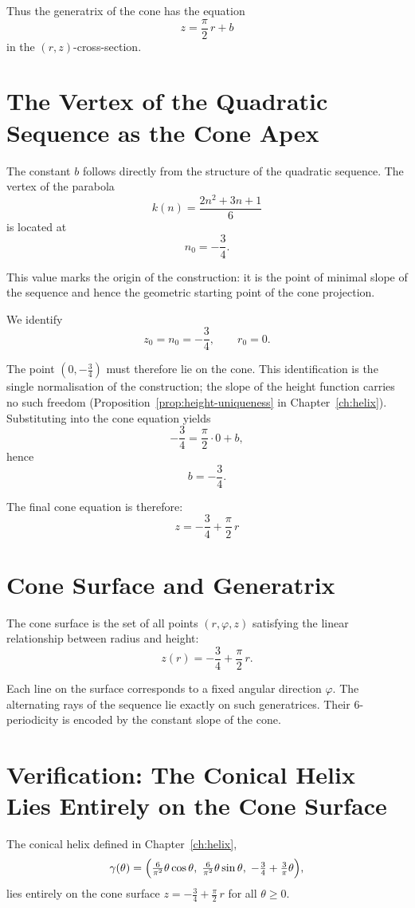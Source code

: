 Thus the generatrix of the cone has the equation
\[
z = \frac{\pi}{2}\,r + b
\]
in the $(r,z)$-cross-section.

\section{The Vertex of the Quadratic Sequence as the Cone Apex}

The constant $b$ follows directly from the structure of the quadratic
sequence. The vertex of the parabola
\[
k(n) = \frac{2n^2 + 3n + 1}{6}
\]
is located at
\[
n_0 = -\frac{3}{4}.
\]

This value marks the origin of the construction: it is the point of
minimal slope of the sequence and hence the geometric starting point of the
cone projection.

We identify
\[
z_0 = n_0 = -\frac{3}{4}, \qquad r_0 = 0.
\]

The point $(0,-\tfrac{3}{4})$ must therefore lie on the cone. This identification is the single normalisation of the construction; the slope of the height function carries no such freedom (Proposition~\ref{prop:height-uniqueness} in Chapter~\ref{ch:helix}). Substituting
into the cone equation yields
\[
-\frac{3}{4} = \frac{\pi}{2}\cdot 0 + b,
\]
hence
\[
b = -\frac{3}{4}.
\]

The final cone equation is therefore:
\[
\boxed{
z = -\frac{3}{4} + \frac{\pi}{2}\,r
}
\]

\section{Cone Surface and Generatrix}

The cone surface is the set of all points $(r,\varphi,z)$ satisfying the
linear relationship between radius and height:
\[
z(r) = -\frac{3}{4} + \frac{\pi}{2}\,r.
\]

Each line on the surface corresponds to a fixed angular direction $\varphi$.
The alternating rays of the sequence lie exactly on such generatrices.
Their 6-periodicity is encoded by the constant slope of the cone.

\section{Verification: The Conical Helix Lies Entirely on the Cone Surface}

\begin{theorem}\label{thm:helix-on-cone}
The conical helix defined in Chapter~\ref{ch:helix},
\[
\gamma(\theta)
= \Bigl(\tfrac{6}{\pi^2}\theta\cos\theta,\;
        \tfrac{6}{\pi^2}\theta\sin\theta,\;
        -\tfrac{3}{4}+\tfrac{3}{\pi}\theta\Bigr),
\]
lies entirely on the cone surface
$z = -\tfrac{3}{4} + \tfrac{\pi}{2}\,r$ for all $\theta \geq 0$.
\end{theorem}

